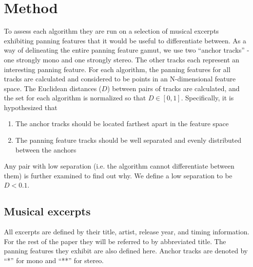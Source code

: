 \documentclass[twoside,a4paper]{article}
\begin{document}
\section{Method}
\label{sec:method}

To assess each algorithm they are run on a selection of musical excerpts exhibiting panning features that it would be useful to differentiate between. As a way of delineating the entire panning feature gamut, we use two \enquote{anchor tracks} - one strongly mono and one strongly stereo. The other tracks each represent an interesting panning feature. For each algorithm, the panning features for all tracks are calculated and considered to be points in an N-dimensional feature space. The Euclidean distances ($D$) between pairs of tracks are calculated, and the set for each algorithm is normalized so that $D \in [0,1]$. Specifically, it is hypothesized that 

\begin{enumerate}
  \item The anchor tracks should be located farthest apart in the feature space \label{hyp:anchors}
  \item The panning feature tracks should be well separated and evenly distributed between the anchors \label{hyp:sep}
\end{enumerate}

Any pair with low separation (i.e. the algorithm cannot differentiate between them) is further examined to find out why. We define a low separation to be $D<0.1$. 

\subsection{Musical excerpts}
\label{ssec:method_musical_excerpts}

All excerpts are defined by their title, artist, release year, and timing information. For the rest of the paper they will be referred to by abbreviated title. The panning features they exhibit are also defined here. Anchor tracks are denoted by \enquote{*} for mono and \enquote{**} for stereo.
\end{document}
